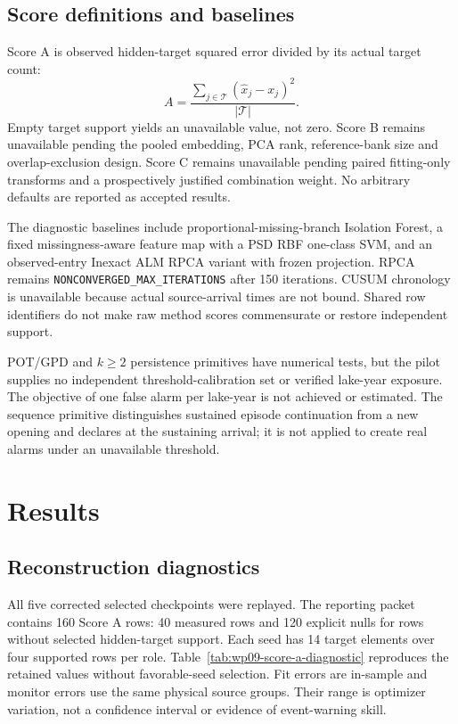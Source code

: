 \documentclass[10pt,twocolumn]{article}
\begin{document}
\subsection{Score definitions and baselines}
Score A is observed hidden-target squared error divided by its actual target count:
\begin{equation}
A=\frac{\sum_{j\in\mathcal T}(\hat x_j-x_j)^2}{|\mathcal T|}.
\end{equation}
Empty target support yields an unavailable value, not zero. Score B remains unavailable pending the pooled embedding, PCA rank, reference-bank size and overlap-exclusion design. Score C remains unavailable pending paired fitting-only transforms and a prospectively justified combination weight. No arbitrary defaults are reported as accepted results.

The diagnostic baselines include proportional-missing-branch Isolation Forest, a fixed missingness-aware feature map with a PSD RBF one-class SVM, and an observed-entry Inexact ALM RPCA variant with frozen projection. RPCA remains \texttt{NONCONVERGED\_MAX\_ITERATIONS} after 150 iterations. CUSUM chronology is unavailable because actual source-arrival times are not bound. Shared row identifiers do not make raw method scores commensurate or restore independent support.

POT/GPD and $k\ge2$ persistence primitives have numerical tests, but the pilot supplies no independent threshold-calibration set or verified lake-year exposure. The objective of one false alarm per lake-year is not achieved or estimated. The sequence primitive distinguishes sustained episode continuation from a new opening and declares at the sustaining arrival; it is not applied to create real alarms under an unavailable threshold.

\section{Results}
\subsection{Reconstruction diagnostics}
\begingroup
\renewenvironment{table}[1][]{\begin{table}[t]}{\end{table}}

\endgroup

All five corrected selected checkpoints were replayed. The reporting packet contains 160 Score A rows: 40 measured rows and 120 explicit nulls for rows without selected hidden-target support. Each seed has 14 target elements over four supported rows per role. Table~\ref{tab:wp09-score-a-diagnostic} reproduces the retained values without favorable-seed selection. Fit errors are in-sample and monitor errors use the same physical source groups. Their range is optimizer variation, not a confidence interval or evidence of event-warning skill.
\end{document}
